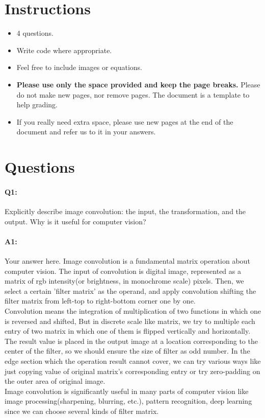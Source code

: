 	\maketitle
	\vspace{-3cm}
	\thispagestyle{fancy}
	
	\section*{Instructions}
	\begin{itemize}
		\item 4 questions.
		\item Write code where appropriate.
		\item Feel free to include images or equations.
		\item \textbf{Please use only the space provided and keep the page breaks.} Please do not make new pages, nor remove pages. The document is a template to help grading.
		\item If you really need extra space, please use new pages at the end of the document and refer us to it in your answers.
	\end{itemize}

	\section*{Questions}
	
	\paragraph{Q1:} Explicitly describe image convolution: the input, the transformation, and the output. Why is it useful for computer vision?
	
	\paragraph{A1:} Your answer here.
	Image convolution is a fundamental matrix operation about computer vision. The input of convolution is digital image,
	represented as a matrix of rgb intensity(or brightness, in monochrome scale) pixels. Then, we select a certain 'filter matrix' 
	as the operand, and apply convolution shifting the filter matrix from left-top to right-bottom corner one by one.
	\\Convolution means the integration of multiplication of two functions in which one is reversed and shifted, 	       
	But in discrete scale like matrix, we try to multiple each entry of two matrix in which one of them is flipped vertically and horizontally.
	The result value is placed in the output image at a location corresponding to the center of the filter, so we should ensure the size
	of filter as odd number. In the edge section which the operation result cannot cover, we can try various ways like just copying value of 		      
	original matrix's corresponding entry or try zero-padding on the outer area of original image.
	\\Image convolution is significantly useful in many parts of computer vision like image processing(sharpening, blurring, etc.), 
	pattern recognition, deep learning since we can choose several kinds of filter matrix. 
	
